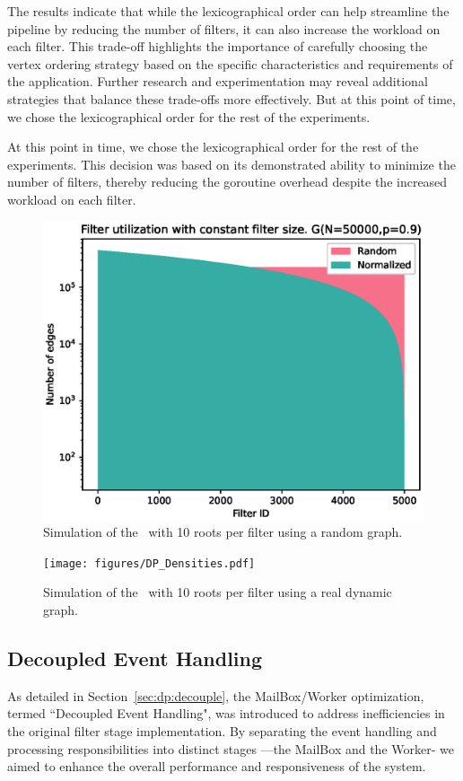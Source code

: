     The results indicate that while the lexicographical order can help streamline the pipeline by reducing the number of filters, it can also increase the workload on each filter. This trade-off highlights the importance of carefully choosing the vertex ordering strategy based on the specific characteristics and requirements of the application. Further research and experimentation may reveal additional strategies that balance these trade-offs more effectively. But at this point of time, we chose the lexicographical order for the rest of the experiments.
    
    At this point in time, we chose the lexicographical order for the rest of the experiments. This decision was based on its demonstrated ability to minimize the number of filters, thereby reducing the goroutine overhead despite the increased workload on each filter.
    
    \begin{figure}
        \centering
        \includegraphics[width=0.9\linewidth]{figures/DP_Densities_random}
        \caption{Simulation of the \DPmst\ with 10 roots per filter using a random graph.}
        \label{fig:density:random}
    \end{figure}
    
    \begin{figure}
        \centering
        \texttt{[image: figures/DP\_Densities.pdf]}
        \caption{Simulation of the \DPmst\ with 10 roots per filter using a real dynamic graph.}
        \label{fig:density:real}
    \end{figure}

    
    \subsection*{Decoupled Event Handling}
    As detailed in Section~\ref{sec:dp:decouple}, the MailBox/Worker optimization, termed ``Decoupled Event Handling", was introduced to address inefficiencies in the original filter stage implementation. By separating the event handling and processing responsibilities into distinct stages —the MailBox and the Worker- we aimed to enhance the overall performance and responsiveness of the system.

